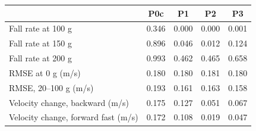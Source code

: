 \begin{tabular}{@{}lcccc@{}}
\toprule
 & P0c & P1 & P2 & P3\\
\midrule
Fall rate at 100 g & 0.346 & 0.000 & 0.000 & 0.001\\
Fall rate at 150 g & 0.896 & 0.046 & 0.012 & 0.124\\
Fall rate at 200 g & 0.993 & 0.462 & 0.465 & 0.658\\
\midrule
RMSE at 0 g (m/s) & 0.180 & 0.180 & 0.181 & 0.180\\
RMSE, 20--100 g (m/s) & 0.193 & 0.161 & 0.163 & 0.158\\
\midrule
Velocity change, backward (m/s) & 0.175 & 0.127 & 0.051 & 0.067\\
Velocity change, forward fast (m/s) & 0.172 & 0.108 & 0.019 & 0.047\\
\bottomrule
\end{tabular}
